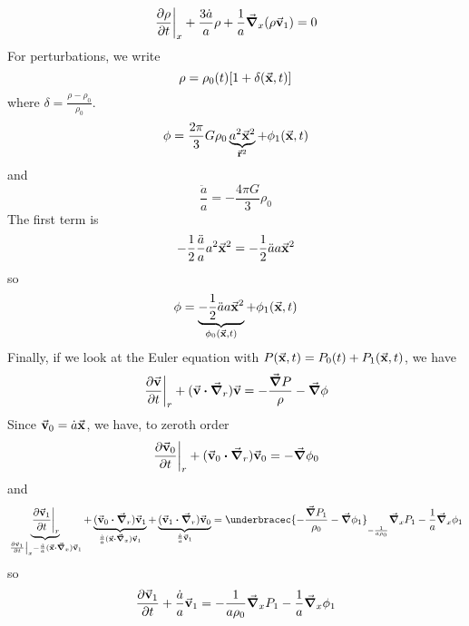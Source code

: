 \documentclass[a4paper,twoside,master.tex]{subfiles}
\begin{document}
\begin{equation}
    \eval{\pdv{\rho}{t}}_{x} + \frac{3 \dot{a}}{a} \rho + \frac{1}{a} \grad_x(\rho \va{v}_1) = 0
\end{equation}
For perturbations, we write
\begin{equation}
    \rho = \rho_0(t) [1 + \delta(\va{x}, t)]
\end{equation}
where $ \delta = \frac{\rho - \rho_0}{\rho_0} $.
\begin{equation}
    \phi = \frac{2 \pi}{3} G \rho_0 \underbrace{a^2 \va{x}^2}_{\va{r}^2} + \phi_1(\va{x}, t)
\end{equation}
and
\begin{equation}
    \frac{\ddot{a}}{a} = - \frac{4 \pi G}{3} \rho_0
\end{equation}
The first term is
\begin{equation}
    - \frac{1}{2} \frac{\ddot{a}}{a} a^2 \va{x}^2 = - \frac{1}{2} \ddot{a} a \va{x}^2
\end{equation}
so
\begin{equation}
    \phi = \underbrace{- \frac{1}{2} \ddot{a} a \va{x}^2}_{\phi_0(\va{x}, t)} + \phi_1(\va{x}, t)
\end{equation}
Finally, if we look at the Euler equation with $ P(\va{x}, t) = P_0(t) + P_1(\va{x}, t) $, we have
\begin{equation}
    \eval{\pdv{\va{v}}{t}}_{r} + (\va{v} \vdot \grad_r) \va{v} = - \frac{\grad{P}}{\rho} - \grad{\phi}
\end{equation}
Since $ \va{v}_0 = \dot{a} \va{x} $, we have, to zeroth order
\begin{equation}
    \eval{\pdv{\va{v}_0}{t}}_{r} + (\va{v}_0 \vdot \grad_r) \va{v}_0 = - \grad{\phi_0}
\end{equation}
and
\begin{equation}
    \underbrace{\eval{\pdv{\va{v}_1}{t}}_{r}}_{\eval{\pdv{\va{v}_1}{t}}_{x} - \frac{\dot{a}}{a} (\va{x} \vdot \grad_x) \va{v}_1} + \underbrace{(\va{v}_0 \vdot \grad_r) \va{v}_1}_{\frac{\dot{a}}{a} (\va{x} \vdot \grad_x) \va{v}_1} + \underbrace{(\va{v}_1 \vdot \grad_r) \va{v}_0}_{\frac{\dot{a}}{a} \va{v}_1} = \underbracec{- \frac{\grad{P_1}}{\rho_0} - \grad{\phi_1}}_{- \frac{1}{a \rho_0}}\grad_x{P_1} - \frac{1}{a} \grad_x{\phi_1}
\end{equation}
so
\begin{equation}
    \pdv{\va{v}_1}{t} + \frac{\dot{a}}{a} \va{v}_1 = - \frac{1}{a \rho_0} \grad_x{P_1} - \frac{1}{a} \grad_x{\phi_1}
\end{equation}
\end{document}
